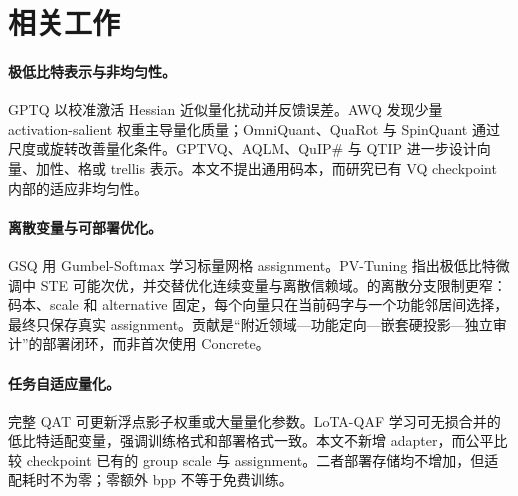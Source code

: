 \section{相关工作}

\paragraph{极低比特表示与非均匀性。}GPTQ 以校准激活 Hessian 近似量化扰动并反馈误差\cite{gptq}。AWQ 发现少量 activation-salient 权重主导量化质量\cite{awq}；OmniQuant、QuaRot 与 SpinQuant 通过尺度或旋转改善量化条件\cite{omniquant,quarot,spinquant}。GPTVQ、AQLM、QuIP\# 与 QTIP 进一步设计向量、加性、格或 trellis 表示\cite{gptvq,aqlm,quipsharp,qtip}。本文不提出通用码本，而研究已有 VQ checkpoint 内部的适应非均匀性。

\paragraph{离散变量与可部署优化。}GSQ 用 Gumbel-Softmax 学习标量网格 assignment\cite{gsq,gumbel}。PV-Tuning 指出极低比特微调中 STE 可能次优，并交替优化连续变量与离散信赖域\cite{pvtuning}。\method 的离散分支限制更窄：码本、scale 和 alternative 固定，每个向量只在当前码字与一个功能邻居间选择，最终只保存真实 assignment。贡献是“附近领域—功能定向—嵌套硬投影—独立审计”的部署闭环，而非首次使用 Concrete\cite{concrete}。

\paragraph{任务自适应量化。}完整 QAT 可更新浮点影子权重或大量量化参数。LoTA-QAF 学习可无损合并的低比特适配变量，强调训练格式和部署格式一致\cite{lotaqaf}。本文不新增 adapter，而公平比较 checkpoint 已有的 group scale 与 assignment。二者部署存储均不增加，但适配耗时不为零；零额外 bpp 不等于免费训练。
